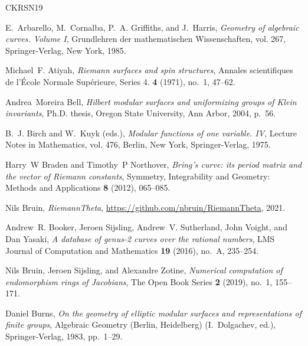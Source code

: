 \documentclass{amsart}
\begin{document}
\newcommand{\etalchar}[1]{$^{#1}$}
\providecommand{\bysame}{\leavevmode\hbox to3em{\hrulefill}\thinspace}
\providecommand{\MR}{\relax\ifhmode\unskip\space\fi MR }
\providecommand{\MRhref}[2]{%
  \href{http://www.ams.org/mathscinet-getitem?mr=#1}{#2}
}
\providecommand{\href}[2]{#2}
\begin{thebibliography}{CKRSN19}

E.~Arbarello, M.~Cornalba, P.~A. Griffiths, and J.~Harris, \emph{Geometry of
  algebraic curves. {Volume} {I}}, Grundlehren der mathematischen
  Wissenschaften, vol. 267, Springer-Verlag, New York, 1985.

Michael~F. Atiyah, \emph{Riemann surfaces and spin structures}, Annales
  scientifiques de l'\'Ecole Normale Sup\'erieure, Series 4. \textbf{4} (1971),
  no.~1, 47--62.

Andrea~Moreira Bell, \emph{Hilbert modular surfaces and uniformizing groups of
  {K}lein invariants}, Ph.D. thesis, Oregon State University, Ann Arbor, 2004,
  p.~56.

B.~J. Birch and W.~Kuyk (eds.), \emph{Modular functions of one variable. {IV}},
  Lecture Notes in Mathematics, vol. 476, Berlin, New York, Springer-Verlag,
  1975.

Harry~W Braden and Timothy~P Northover, \emph{{B}ring’s curve: its period
  matrix and the vector of {R}iemann constants}, Symmetry, Integrability and
  Geometry: Methods and Applications \textbf{8} (2012), 065--085.

Nils Bruin, \emph{Riemann{T}heta},
  \url{https://github.com/nbruin/RiemannTheta}, 2021.

\bibitem[BSS{\etalchar{+}}16]{Booker2016}
Andrew~R. Booker, Jeroen Sijsling, Andrew~V. Sutherland, John Voight, and Dan
  Yasaki, \emph{A database of genus-2 curves over the rational numbers}, LMS
  Journal of Computation and Mathematics \textbf{19} (2016), no.~A, 235--254.

Nils Bruin, Jeroen Sijsling, and Alexandre Zotine, \emph{Numerical computation
  of endomorphism rings of {J}acobians}, The Open Book Series \textbf{2}
  (2019), no.~1, 155–171.

Daniel Burns, \emph{On the geometry of elliptic modular surfaces and
  representations of finite groups}, Algebraic Geometry (Berlin, Heidelberg)
  (I.~Dolgachev, ed.), Springer-Verlag, 1983, pp.~1--29.


\end{thebibliography}
\end{document}
